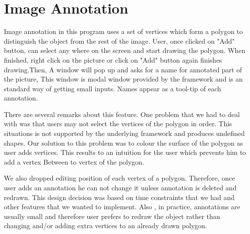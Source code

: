 \section{Image Annotation}
Image annotation in this program uses a set of vertices which form a polygon to distinguish the object from the rest of the image. User, once clicked on "Add" button, can select any where on the screen and start drawing the polygon. When finished, right click on the picture or click on "Add" button again finishes drawing.Then, A window will pop up and asks for a name for annotated part of the picture, This window is modal window provided by the framework and is an standard way of getting small inputs. Names appear as a tool-tip of each annotation.

There are several remarks about this feature. One problem that we had to deal with was that users may not select the vertices of the polygon in order. This situations is not supported by the underlying framework and produces undefined shapes. Our solution to this problem was to colour the surface of the polygon as user adds vertices. This results to an intuition for the user which prevents him to add a vertex Between to vertex of the polygon.

We also dropped editing position of each vertex of a polygon. Therefore, once user adds an annotation he can not change it unless annotation is deleted and redrawn. This design decision was based on time constraints that we had and other features that we wanted to implement. Also , in practice, annotations are usually small and therefore user prefers to redraw the object rather than changing and/or adding extra vertices to an already drawn polygon.